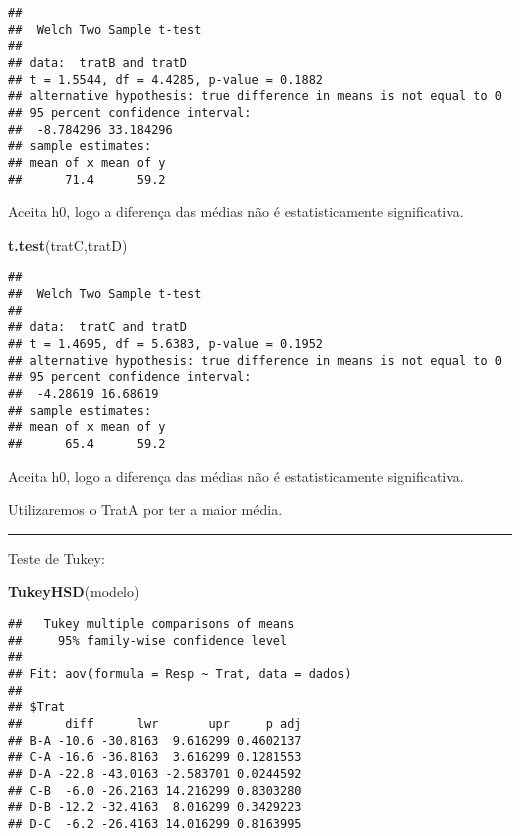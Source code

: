 \documentclass[
]{article}
\newenvironment{Shaded}{\begin{snugshade}}{\end{snugshade}}
\newcommand{\FunctionTok}[1]{\textcolor[rgb]{0.13,0.29,0.53}{\textbf{#1}}}
\newcommand{\NormalTok}[1]{#1}
\begin{document}
\begin{verbatim}
## 
##  Welch Two Sample t-test
## 
## data:  tratB and tratD
## t = 1.5544, df = 4.4285, p-value = 0.1882
## alternative hypothesis: true difference in means is not equal to 0
## 95 percent confidence interval:
##  -8.784296 33.184296
## sample estimates:
## mean of x mean of y 
##      71.4      59.2
\end{verbatim}

Aceita h0, logo a diferença das médias não é estatisticamente
significativa.

\begin{Shaded}
\begin{Highlighting}[]
\FunctionTok{t.test}\NormalTok{(tratC,tratD)}
\end{Highlighting}
\end{Shaded}

\begin{verbatim}
## 
##  Welch Two Sample t-test
## 
## data:  tratC and tratD
## t = 1.4695, df = 5.6383, p-value = 0.1952
## alternative hypothesis: true difference in means is not equal to 0
## 95 percent confidence interval:
##  -4.28619 16.68619
## sample estimates:
## mean of x mean of y 
##      65.4      59.2
\end{verbatim}

Aceita h0, logo a diferença das médias não é estatisticamente
significativa.

Utilizaremos o TratA por ter a maior média.

\begin{center}\rule{0.5\linewidth}{0.5pt}\end{center}

Teste de Tukey:

\begin{Shaded}
\begin{Highlighting}[]
\FunctionTok{TukeyHSD}\NormalTok{(modelo)}
\end{Highlighting}
\end{Shaded}

\begin{verbatim}
##   Tukey multiple comparisons of means
##     95% family-wise confidence level
## 
## Fit: aov(formula = Resp ~ Trat, data = dados)
## 
## $Trat
##      diff      lwr       upr     p adj
## B-A -10.6 -30.8163  9.616299 0.4602137
## C-A -16.6 -36.8163  3.616299 0.1281553
## D-A -22.8 -43.0163 -2.583701 0.0244592
## C-B  -6.0 -26.2163 14.216299 0.8303280
## D-B -12.2 -32.4163  8.016299 0.3429223
## D-C  -6.2 -26.4163 14.016299 0.8163995
\end{verbatim}
\end{document}

